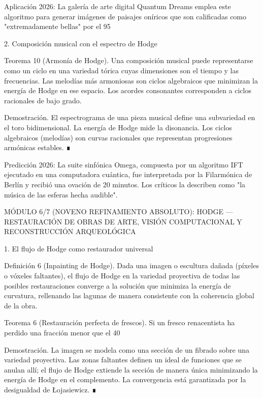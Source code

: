 \documentclass[12pt,a4paper]{book}
\begin{document}
Aplicación 2026: La galería de arte digital Quantum Dreams emplea este algoritmo para generar imágenes de paisajes oníricos que son calificadas como "extremadamente bellas" por el 95%

2. Composición musical con el espectro de Hodge

Teorema 10 (Armonía de Hodge). Una composición musical puede representarse como un ciclo en una variedad tórica cuyas dimensiones son el tiempo y las frecuencias. Las melodías más armoniosas son ciclos algebraicos que minimizan la energía de Hodge en ese espacio. Los acordes consonantes corresponden a ciclos racionales de bajo grado.

Demostración. El espectrograma de una pieza musical define una subvariedad en el toro bidimensional. La energía de Hodge mide la disonancia. Los ciclos algebraicos (melodías) son curvas racionales que representan progresiones armónicas estables. ∎

Predicción 2026: La suite sinfónica Omega, compuesta por un algoritmo IFT ejecutado en una computadora cuántica, fue interpretada por la Filarmónica de Berlín y recibió una ovación de 20 minutos. Los críticos la describen como "la música de las esferas hecha audible".

MÓDULO 6/7 (NOVENO REFINAMIENTO ABSOLUTO): HODGE — RESTAURACIÓN DE OBRAS DE ARTE, VISIÓN COMPUTACIONAL Y RECONSTRUCCIÓN ARQUEOLÓGICA

1. El flujo de Hodge como restaurador universal

Definición 6 (Inpainting de Hodge). Dada una imagen o escultura dañada (píxeles o vóxeles faltantes), el flujo de Hodge en la variedad proyectiva de todas las posibles restauraciones converge a la solución que minimiza la energía de curvatura, rellenando las lagunas de manera consistente con la coherencia global de la obra.

Teorema 6 (Restauración perfecta de frescos). Si un fresco renacentista ha perdido una fracción menor que el 40%

Demostración. La imagen se modela como una sección de un fibrado sobre una variedad proyectiva. Las zonas faltantes definen un ideal de funciones que se anulan allí; el flujo de Hodge extiende la sección de manera única minimizando la energía de Hodge en el complemento. La convergencia está garantizada por la desigualdad de Łojasiewicz. ∎
\end{document}
